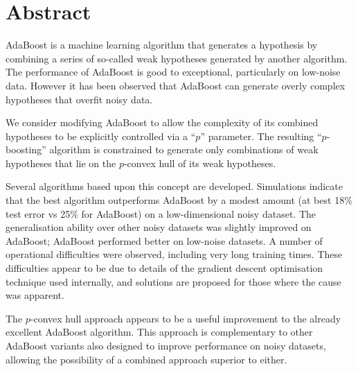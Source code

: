 
\chapter{Abstract}

AdaBoost is a machine learning algorithm that generates a hypothesis
by combining a series of so-called weak hypotheses generated by another
algorithm.  The performance of AdaBoost is good to exceptional,
particularly on low-noise data.  However it has been observed that
AdaBoost can generate overly complex hypotheses that overfit noisy
data.

We consider modifying AdaBoost to allow the complexity of its combined
hypotheses to be explicitly controlled via a ``$p$'' parameter. 
The resulting ``$p$-boosting'' algorithm is constrained to generate
only combinations of weak hypotheses that lie on the $p$-convex hull
of its weak hypotheses.

Several algorithms based upon this concept are developed.  Simulations
indicate that the best algorithm outperforms AdaBoost by a modest
amount (at best 18\% test error vs 25\% for AdaBoost) on a
low-dimensional noisy dataset.  The generalisation ability over other
noisy datasets was slightly improved on AdaBoost; AdaBoost performed
better on low-noise datasets.  A number of operational difficulties
were observed, including very long training times.  These difficulties
appear to be due to details of the gradient descent optimisation
technique used internally, and solutions are proposed for those where
the cause was apparent. 

The $p$-convex hull approach appears to be a useful improvement to the
already excellent AdaBoost algorithm.  This approach is complementary
to other AdaBoost variants also designed to improve performance on
noisy datasets, allowing the possibility of a combined approach
superior to either.

